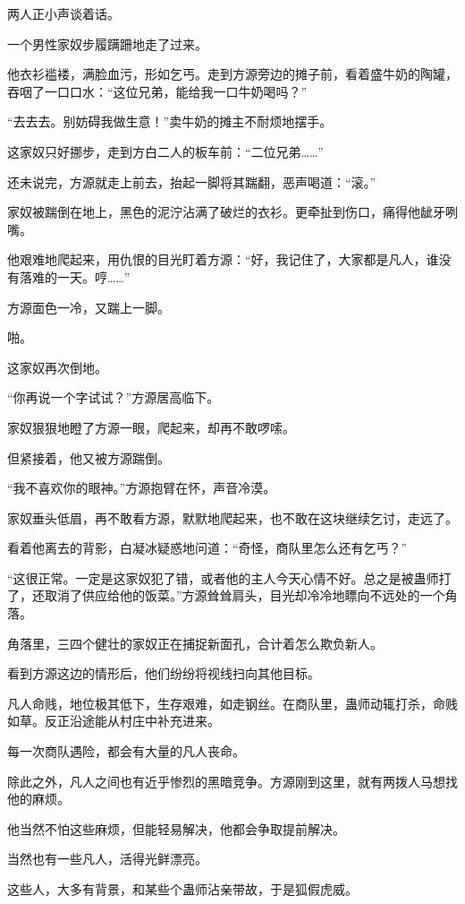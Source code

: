 \begin{this_body}
两人正小声谈着话。

一个男性家奴步履蹒跚地走了过来。

他衣衫褴褛，满脸血污，形如乞丐。走到方源旁边的摊子前，看着盛牛奶的陶罐，吞咽了一口口水：“这位兄弟，能给我一口牛奶喝吗？”

“去去去。别妨碍我做生意！”卖牛奶的摊主不耐烦地摆手。

这家奴只好挪步，走到方白二人的板车前：“二位兄弟……”

还未说完，方源就走上前去，抬起一脚将其踹翻，恶声喝道：“滚。”

家奴被踹倒在地上，黑色的泥泞沾满了破烂的衣衫。更牵扯到伤口，痛得他龇牙咧嘴。

他艰难地爬起来，用仇恨的目光盯着方源：“好，我记住了，大家都是凡人，谁没有落难的一天。哼……”

方源面色一冷，又踹上一脚。

啪。

这家奴再次倒地。

“你再说一个字试试？”方源居高临下。

家奴狠狠地瞪了方源一眼，爬起来，却再不敢啰嗦。

但紧接着，他又被方源踹倒。

“我不喜欢你的眼神。”方源抱臂在怀，声音冷漠。

家奴垂头低眉，再不敢看方源，默默地爬起来，也不敢在这块继续乞讨，走远了。

看着他离去的背影，白凝冰疑惑地问道：“奇怪，商队里怎么还有乞丐？”

“这很正常。一定是这家奴犯了错，或者他的主人今天心情不好。总之是被蛊师打了，还取消了供应给他的饭菜。”方源耸耸肩头，目光却冷冷地瞟向不远处的一个角落。

角落里，三四个健壮的家奴正在捕捉新面孔，合计着怎么欺负新人。

看到方源这边的情形后，他们纷纷将视线扫向其他目标。

凡人命贱，地位极其低下，生存艰难，如走钢丝。在商队里，蛊师动辄打杀，命贱如草。反正沿途能从村庄中补充进来。

每一次商队遇险，都会有大量的凡人丧命。

除此之外，凡人之间也有近乎惨烈的黑暗竞争。方源刚到这里，就有两拨人马想找他的麻烦。

他当然不怕这些麻烦，但能轻易解决，他都会争取提前解决。

当然也有一些凡人，活得光鲜漂亮。

这些人，大多有背景，和某些个蛊师沾亲带故，于是狐假虎威。


\end{this_body}
